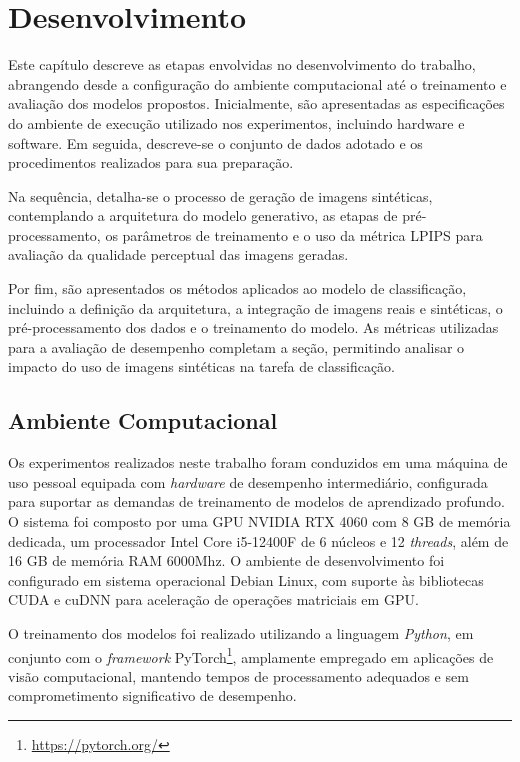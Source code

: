 \documentclass[
	12pt,				%
	openright,			%
	oneside,			%
	a4paper,			%
	tcc,			%
	]{ABNT-DC-UEL}
\begin{document}


\chapter{Desenvolvimento}

Este capítulo descreve as etapas envolvidas no desenvolvimento do trabalho, abrangendo desde a configuração do ambiente computacional até o treinamento e avaliação dos modelos propostos. Inicialmente, são apresentadas as especificações do ambiente de execução utilizado nos experimentos, incluindo hardware e software. Em seguida, descreve-se o conjunto de dados adotado e os procedimentos realizados para sua preparação.

Na sequência, detalha-se o processo de geração de imagens sintéticas, contemplando a arquitetura do modelo generativo, as etapas de pré-processamento, os parâmetros de treinamento e o uso da métrica LPIPS para avaliação da qualidade perceptual das imagens geradas.

Por fim, são apresentados os métodos aplicados ao modelo de classificação, incluindo a definição da arquitetura, a integração de imagens reais e sintéticas, o pré-processamento dos dados e o treinamento do modelo. As métricas utilizadas para a avaliação de desempenho completam a seção, permitindo analisar o impacto do uso de imagens sintéticas na tarefa de classificação.

\section{Ambiente Computacional}

Os experimentos realizados neste trabalho foram conduzidos em uma máquina de uso pessoal equipada com \textit{hardware} de desempenho intermediário, configurada para suportar as demandas de treinamento de modelos de aprendizado profundo. O sistema foi composto por uma GPU NVIDIA RTX 4060 com 8 GB de memória dedicada, um processador Intel Core i5-12400F de 6 núcleos e 12 \textit{threads}, além de 16 GB de memória RAM 6000Mhz. O ambiente de desenvolvimento foi configurado em sistema operacional Debian Linux, com suporte às bibliotecas CUDA e cuDNN para aceleração de operações matriciais em GPU.

O treinamento dos modelos foi realizado utilizando a linguagem \textit{Python}, em conjunto com o \textit{framework} PyTorch\footnote{\url{https://pytorch.org/}}, amplamente empregado em aplicações de visão computacional, mantendo tempos de processamento adequados e sem comprometimento significativo de desempenho.
\end{document}
